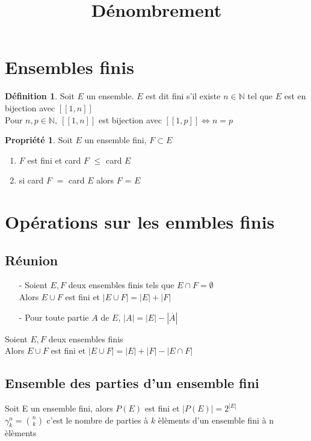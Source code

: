 \documentclass[fleqn]{article}
\title{D\'enombrement}
\date{}
\theoremstyle{definition} \newtheorem*{defi}{D\'efinition}
\theoremstyle{definition} \newtheorem*{theo}{Th\'eor\`eme}
\theoremstyle{definition} \newtheorem*{coro}{Corollaire}
\theoremstyle{remark} \newtheorem*{rqs}{Remarques}
\theoremstyle{definition} \newtheorem*{prop}{Propri\'et\'e}
\begin{document}
\maketitle

\section{Ensembles finis}
\begin{defi}
	Soit $E$ un ensemble. $E$ est dit fini s'il existe $n \in \mathbb{N}$ tel que $E$ est en bijection avec $[\![1,n]\!]$ \\
	Pour $n, p \in \mathbb{N},\ [\![1,n]\!]$ est bijection avec $[\![1,p]\!] \Leftrightarrow n = p$
\end{defi}

\begin{prop} Soit $E$ un ensemble fini, $F \subset E$
	\begin{enumerate}
		\item $F$ est fini et card $F$ $\leq$ card $E$
		\item si card $F$ $=$ card $E$ alors $F$ = $E$
	\end{enumerate}
\end{prop}

\section{Op\'erations sur les enmbles finis}
\subsection{R\'eunion}
\begin{itemize}
	\item [-] Soient $E, F$ deux ensembles finis tels que $E \cap F = \emptyset$ \\
		Alors $E \cup F$ est fini et $|E \cup F| = |E| + |F|$
	\item [-] Pour toute partie $A$ de $E$, $|A| = |E| - |\overline{A}|$
\end{itemize}
Soient $E, F$ deux ensembles finis \\
Alors $E\cup F$ est fini et $|E \cup F| = |E| + |F| - |E \cap F|$

\subsection{Ensemble des parties d'un ensemble fini}
Soit E un ensemble fini, alors $P(E)$ est fini et $|P(E)| = 2^{|E|}$ \\
$\gamma_k^n = \binom{n}{k}$ c'est le nombre de parties \`a $k$ \`el\`ements d'un ensemble fini \`a n \`el\`ements
\end{document}
